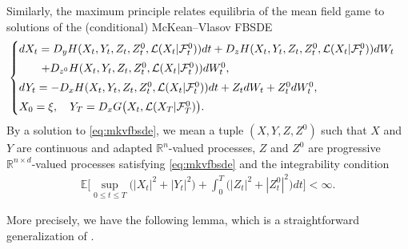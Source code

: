 \documentclass[11pt,reqno]{amsart}
\numberwithin{equation}{section}
\theoremstyle{definition}
\def\E{{\mathbb E}}
\def\R{{\mathbb R}}
\newcommand{\sL}{\mathcal{L}}
\newcommand{\sF}{\mathcal{F}}
\newcommand\cF{\mathcal F}
\def \E{\mathbb{E}}
\def \R{\mathbb{R}}
\begin{document}
Similarly, the maximum principle relates equilibria of the mean field game to solutions of the (conditional) McKean--Vlasov FBSDE 
\begin{align} \label{eq:mkvfbsde}
  \begin{cases} \vspace{.1cm}
    dX_t = D_y H(X_t, Y_t, Z_t, Z_t^0, \sL(X_t | \sF_t^0)) dt + D_z H(X_t, Y_t, Z_t, Z_t^0, \sL(X_t | \sF_t^0)) dW_t  \\ \vspace{.1cm}
    \qquad + D_{z^0} H(X_t, Y_t, Z_t, Z_t^0, \sL(X_t | \sF_t^0)) dW_t^0,  \\ \vspace{.1cm}
  dY_t = - D_x H(X_t, Y_t, Z_t, Z_t^0, \sL(X_t | \sF_t^0)) dt + Z_t  dW_t + Z_t^{0}  dW_t^0, \\
  X_0 = \xi, \quad Y_T = D_x G\big(X_t, \sL(X_T | \cF_T^0)\big).%
\end{cases}
\end{align}
By a solution to \eqref{eq:mkvfbsde}, we mean a tuple $(X,Y,Z,Z^0)$ such that $X$ and $Y$ are continuous and adapted $\R^n$-valued processes, $Z$ and $Z^0$ are progressive $\R^{n \times d}$-valued processes
 satisfying \eqref{eq:mkvfbsde} and the integrability condition 
\begin{align} \label{intconditionmkv}
\E\bigg[\sup_{0 \leq t \leq T} \big(|X_t|^2 + |Y_t|^2\big) + \int_0^T \Big(|Z_t|^2 +|Z_t^0|^2 \Big) dt \bigg] < \infty. 
\end{align}

More precisely, we have the following lemma, which is a straightforward generalization of \cite[Theorem 3.27]{cardelbook1}.
\end{document}
